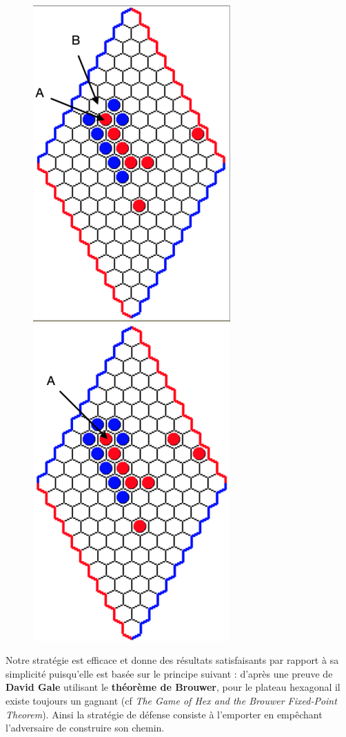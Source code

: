 \documentclass{article}
\begin{document}
\begin{figure}[H]
    \centering
    \includegraphics[scale=0.5]{3.png}
    \includegraphics[scale=0.5]{4.png}
\end{figure}


Notre stratégie est efficace et donne des résultats satisfaisants par rapport à sa simplicité puisqu'elle est basée sur le principe suivant : d'après une preuve de \textbf{David Gale} utilisant le \textbf{théorème de Brouwer}, pour le plateau hexagonal il existe toujours un gagnant (cf \textit{The Game of Hex and the Brouwer Fixed-Point Theorem}). Ainsi la stratégie de défense consiste à l'emporter en empêchant l'adversaire de construire son chemin.
\vspace{6pt}
\end{document}
